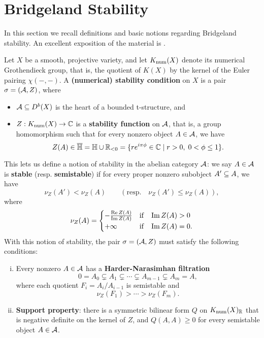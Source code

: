 \documentclass[letterpaper,11pt]{amsart}%
\theoremstyle{remark}
\begin{document}

\section{Bridgeland Stability}
In this section we recall definitions and basic notions regarding Bridgeland stability. An excellent exposition of the material is \cite{MS}. 

Let $X$ be a smooth, projective variety, and let $K_{\mathrm{num}}(X)$ denote its numerical Grothendieck group, that is, the quotient of $K(X)$ by the kernel of the Euler pairing $\chi(-,-)$. A \textbf{(numerical) stability condition} on $X$ is a pair $\sigma = (\mathcal{A}, Z)$, where \begin{itemize}
    \item $\mathcal{A} \subseteq D^b(X)$ is the heart of a bounded t-structure, and
    \item $Z: K_{\mathrm{num}}(X) \to \mathbb{C}$ is a {\bf stability function} on $\mathcal{A}$, that is, a group homomorphism such that for every nonzero object $A \in \mathcal{A}$, we have 
    \[ Z(A) \in \overline{\mathbb{H}} = \mathbb{H} \cup \mathbb{R}_{<0} = \{ r e^{i\pi\phi} \in \mathbb{C} \;|\; r > 0, \; 0 < \phi \le 1 \}. \]
\end{itemize} 
This lets us define a notion of stability in the abelian category $\mathcal{A}$: we say $A \in \mathcal{A}$ is \textbf{stable} (resp. \textbf{semistable}) if for every proper nonzero subobject $A' \subseteq A$, we have
\[ \nu_Z(A') < \nu_Z(A) \qquad (\mathrm{resp.} \quad \nu_Z(A') \leq \nu_Z(A)), \]
where 
\[ \nu_Z(A) = \begin{cases} -\frac{\mathrm{Re}\, Z(A)}{\mathrm{Im}\, Z(A)} & \mathrm{if} \quad \mathrm{Im}\, Z(A) > 0 \\ +\infty & \mathrm{if} \quad \mathrm{Im}\, Z(A) = 0. \end{cases} \]
With this notion of stability, the pair $\sigma = (\mathcal{A}, Z)$ must satisfy the following conditions:
\begin{enumerate}[(i)]
    \item Every nonzero $A \in \mathcal{A}$ has a {\bf Harder-Narasimhan filtration}
    \[ 0 = A_0 \subsetneq A_1 \subsetneq \cdots \subsetneq A_{m-1} \subsetneq A_m = A, \]
    where each quotient $F_i = A_i/A_{i-1}$ is semistable and
    \[ \nu_Z(F_1) > \cdots > \nu_Z(F_m).  \]
    \item {\bf Support property}: there is a symmetric bilinear form $Q$ on $K_{\mathrm{num}}(X)_{\mathbb{R}}$ that is negative definite on the kernel of $Z$, and $Q(A, A) \ge 0$ for every semistable object $A \in \mathcal{A}$.
\end{enumerate}
\end{document}
